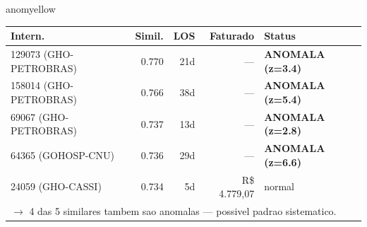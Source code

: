\documentclass[a4paper,10pt]{article}
\begin{document}
\begin{anomalycard}[Internacao 166130 | GHO-PETROBRAS | MODERADO (z=2.21)]{anomyellow}
\begin{tabular}{l r r r l}\toprule\textbf{Intern.} & \textbf{Simil.} & \textbf{LOS} & \textbf{Faturado} & \textbf{Status} \\\midrule
129073 (GHO-PETROBRAS) & 0.770 & 21d & --- & \textcolor{anomred}{\textbf{ANOMALA (z=3.4)}} \\
158014 (GHO-PETROBRAS) & 0.766 & 38d & --- & \textcolor{anomred}{\textbf{ANOMALA (z=5.4)}} \\
69067 (GHO-PETROBRAS) & 0.737 & 13d & --- & \textcolor{anomred}{\textbf{ANOMALA (z=2.8)}} \\
64365 (GOHOSP-CNU) & 0.736 & 29d & --- & \textcolor{anomred}{\textbf{ANOMALA (z=6.6)}} \\
24059 (GHO-CASSI) & 0.734 & 5d & R\$ 4.779,07 & \textcolor{jcubeblue}{normal} \\
\multicolumn{5}{l}{\textcolor{anomred}{\small $\rightarrow$ 4 das 5 similares tambem sao anomalas --- possivel padrao sistematico.}} \\
\bottomrule\end{tabular}


\end{anomalycard}

\newpage
\end{document}
